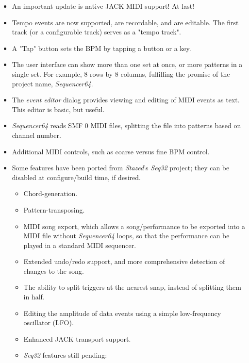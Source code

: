 \documentclass[
 11pt,
 twoside,
 a4paper,
 headinclude,
 footinclude,
 final                                 %
]{article}
\begin{document}
   \begin{itemize}
      \item An important update is native JACK MIDI support!  At last!
      \item Tempo events are now supported, are recordable, and are editable.
         The first track (or a configurable track) serves as a "tempo track".
      \item A "Tap" button sets the BPM by tapping a button or a key.
      \item The user interface can show more than one set at once, or
         more patterns in a single set.  For example, 8 rows by 8 columns,
         fulfilling the promise of the project name, \textsl{Sequencer64}.
      \item The \textsl{event editor} dialog
         provides viewing and editing of MIDI events as text.
         This editor is basic, but useful.
      \item \textsl{Sequencer64} reads SMF 0 MIDI files, splitting
         the file into patterns based on channel number.
      \item Additional MIDI controls, such as coarse versus fine BPM control.
      \item Some features have been ported from \textsl{Stazed}'s
         \textsl{Seq32} \cite{seq32} project; they can be disabled at
         configure/build time, if desired.
         \begin{itemize}
            \item Chord-generation.
            \item Pattern-transposing.
            \item MIDI song export, which
               allows a song/performance to be exported into a MIDI file
               without \textsl{Sequencer64} loops, so that the performance can
               be played in a standard MIDI sequencer.
            \item Extended undo/redo support, and more comprehensive detection
               of changes to the song.
            \item The ability to split triggers at the nearest snap, instead
               of splitting them in half.
            \item Editing the amplitude of data events using a simple
               low-frequency oscillator (LFO).
            \item Enhanced JACK transport support.
            \item \textsl{Seq32} features still pending:
            \begin{itemize}

\end{itemize}
\end{itemize}
\end{itemize}
\end{document}
